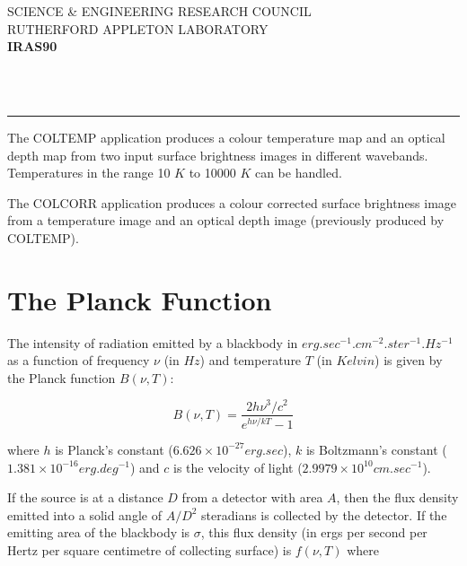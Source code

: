 \thispagestyle{empty}
SCIENCE \& ENGINEERING RESEARCH COUNCIL \hfill \stardocname\\
RUTHERFORD APPLETON LABORATORY\\
{\large\bf IRAS90\\}
{\large\bf \stardoccategory\ \stardocnumber}
\begin{flushright}
\stardocauthors\\
\stardocdate
\end{flushright}
\vspace{-4mm}
\rule{\textwidth}{0.5mm}
\vspace{5mm}
\begin{center}
{\Large\bf \stardoctitle}
\end{center}
\vspace{5mm}
\setlength{\parskip}{0mm} \tableofcontents
\setlength{\parskip}{\medskipamount} \markright{\stardocname}
\vspace{1cm}

The {\small COLTEMP} application produces a colour temperature map and an
optical depth map from two input surface brightness images in different
wavebands. Temperatures in the range 10 $K$ to 10000 $K$ can be handled.

The {\small COLCORR} application produces a colour corrected surface brightness
image from a temperature image and an optical depth image (previously produced
by {\small COLTEMP}).

\section{The Planck Function}

The intensity of radiation emitted by a blackbody in
$erg.sec^{-1}.cm^{-2}.ster^{-1}.Hz^{-1}$ as a function of frequency $\nu$ (in
$Hz$) and temperature $T$ (in $Kelvin$) is given by the Planck function
$B(\nu,T)$:

\begin{equation}
\label{EQ:BB}
B( \nu, T ) = \frac{2h\nu^{3}/c^{2}}{e^{h\nu/kT}-1}
\end{equation}

where $h$ is Planck's constant ($6.626\times 10^{-27} erg.sec$), $k$ is
Boltzmann's constant ($1.381\times 10^{-16} erg.deg^{-1}$) and $c$ is the
velocity of light ($2.9979\times 10^{10} cm.sec^{-1}$).

If the source is at a distance $D$ from a detector with area $A$, then the flux
density emitted into a solid angle of $A/D^{2}$ steradians is collected by the
detector. If the emitting area of the blackbody is $\sigma$, this flux density
(in ergs per second per Hertz per square centimetre of collecting surface) is
$f(\nu,T)$ where

